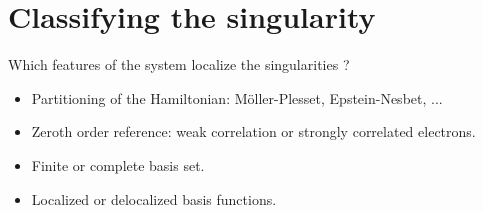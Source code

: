 \documentclass[xcolor=x11names,compress]{beamer}
\renewcommand{\(}{\begin{columns}}
\renewcommand{\)}{\end{columns}}
\newcommand{\<}[1]{\begin{column}{#1}}
\renewcommand{\>}{\end{column}}
\begin{document}
\section{Classifying the singularity}

\begin{frame}{Which features of the system localize the singularities ?}

\begin{itemize}
    \item Partitioning of the Hamiltonian: Möller-Plesset, Epstein-Nesbet, ...
    \item Zeroth order reference: weak correlation or strongly correlated electrons.
    \item Finite or complete basis set.
    \item Localized or delocalized basis functions.
\end{itemize}
    
\end{frame}
\end{document}
